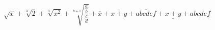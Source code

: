 \[ \sqrt{x}+\sqrt[3]{2}+\sqrt[n]{x^2}+\sqrt[k+1]{\frac{\frac{a}{b}}{\frac{c}{d}}}
   +\overline{x}+\overline{x+y}+\overline{abcdef}+\underline{x+y}+\underline{abcdef} \]
